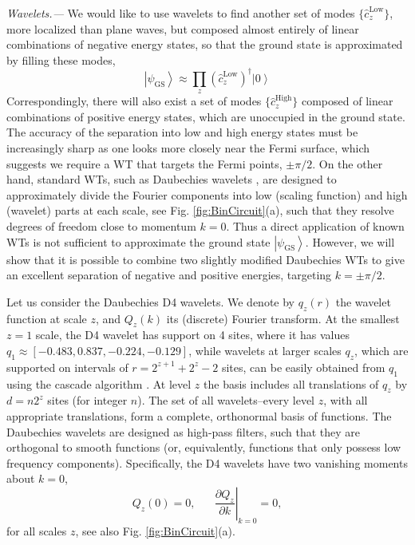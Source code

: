 \documentclass[aps,prl,twocolumn,showpacs,superscriptaddress,floatfix,10pt]{revtex4-1}
\begin{document}
\textit{Wavelets.---} We would like to use wavelets to find another set of 
modes $\{ \hat c_z^\textrm{Low} \}$, 
more localized than plane waves, but composed almost entirely of linear 
combinations of negative energy states, so that the ground state is approximated by filling these modes,
\begin{equation}
\left| {{\psi _\textrm{GS}}} \right\rangle  \approx  {\prod\limits_{z} { \left({{\hat c}_z^\textrm{Low}}\right)^\dag } } \left| 0 \right\rangle \label{eq:12}
\end{equation}
Correspondingly, there will also exist a set of modes $\{ \hat c_z^\textrm{High}
\}$ composed of linear combinations of positive energy states, which are
unoccupied in the ground state. The accuracy of the separation into low and
high energy states must be increasingly sharp as one looks more closely near
the Fermi surface, which suggests we require a WT that targets the Fermi
points, $\pm \pi/2$. On the other hand, standard WTs, such as Daubechies
wavelets \cite{Daub1, Daub2}, are designed to approximately divide the Fourier
components into low (scaling function) and high (wavelet) parts at each scale,
see Fig. \ref{fig:BinCircuit}(a), such that they resolve degrees of freedom
close to momentum $k=0$. Thus a direct application of known WTs is not
sufficient to approximate the ground state $\left| {{\psi _\textrm{GS}}}
\right\rangle$. However, we will show that it is possible to combine two
slightly modified Daubechies WTs to give an excellent separation of negative
and positive energies, targeting $k = \pm \pi/2$.

Let us consider the Daubechies D4 wavelets. 
We denote by $q_z(r)$ the wavelet function at scale $z$, and $Q_z(k)$ its (discrete) 
Fourier transform. At the smallest $z=1$ scale, the D4 wavelet
has support on 4 sites, where it has values $q_1 \approx
[-0.483, 0.837, -0.224, -0.129]$, while wavelets at larger scales $q_z$, which
are supported on intervals of $r = 2^{z+1}+2^z-2$ sites, can be easily obtained
from $q_1$ using the cascade algorithm \cite{WaveBook}. At level $z$ the basis includes 
all translations
of $q_z$ by $d = n 2^z$ sites (for integer $n$). 
The set of all wavelets--every level $z$, with all appropriate translations, form a complete,
orthonormal basis of functions. The Daubechies wavelets are designed as high-pass filters, 
such that they are orthogonal to smooth functions (or, equivalently, functions that only 
possess low frequency components). 
Specifically, the D4 wavelets have two vanishing moments about $k = 0$,
\begin{equation}
{Q_z}\left( 0 \right) = 0, \;\;\;\;\;\; {\left. {\frac{{{\partial}
{Q_z}}}{{\partial {k }}}} \right|_{k  = 0}} = 0,  \label{eq:8}
\end{equation}
for all scales $z$, see also Fig. \ref{fig:BinCircuit}(a).
\end{document}
